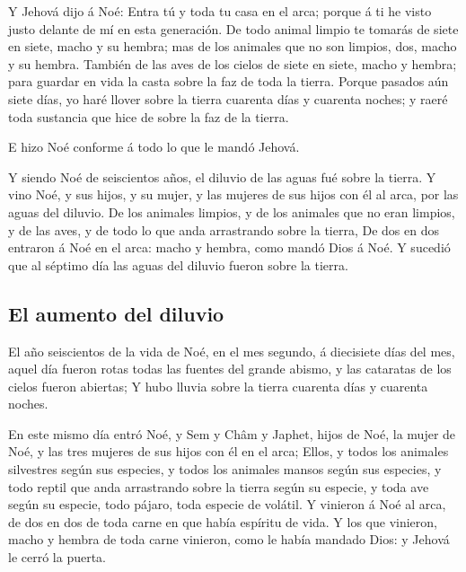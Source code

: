  Y Jehová dijo á Noé: Entra tú y toda tu casa en el arca;
porque á ti he visto justo delante de mí en esta generación.
 De todo animal limpio te tomarás de siete en siete, macho
y su hembra; mas de los animales que no son limpios, dos, macho y su
hembra.  También de las aves de los cielos de siete en
siete, macho y hembra; para guardar en vida la casta sobre la faz de
toda la tierra.  Porque pasados aún siete días, yo haré
llover sobre la tierra cuarenta días y cuarenta noches; y raeré toda
sustancia que hice de sobre la faz de la tierra.

 E hizo Noé conforme á todo lo que le mandó Jehová.

 Y siendo Noé de seiscientos años, el diluvio de las aguas
fué sobre la tierra.  Y vino Noé, y sus hijos, y su mujer,
y las mujeres de sus hijos con él al arca, por las aguas del diluvio.
 De los animales limpios, y de los animales que no eran
limpios, y de las aves, y de todo lo que anda arrastrando sobre la
tierra,  De dos en dos entraron á Noé en el arca: macho y
hembra, como mandó Dios á Noé.  Y sucedió que al séptimo
día las aguas del diluvio fueron sobre la tierra.

\hypertarget{el-aumento-del-diluvio}{%
\subsection{El aumento del diluvio}\label{el-aumento-del-diluvio}}

 El año seiscientos de la vida de Noé, en el mes segundo,
á diecisiete días del mes, aquel día fueron rotas todas las fuentes del
grande abismo, y las cataratas de los cielos fueron abiertas;
 Y hubo lluvia sobre la tierra cuarenta días y cuarenta
noches.

 En este mismo día entró Noé, y Sem y Châm y Japhet,
hijos de Noé, la mujer de Noé, y las tres mujeres de sus hijos con él en
el arca;  Ellos, y todos los animales silvestres según
sus especies, y todos los animales mansos según sus especies, y todo
reptil que anda arrastrando sobre la tierra según su especie, y toda ave
según su especie, todo pájaro, toda especie de volátil. 
Y vinieron á Noé al arca, de dos en dos de toda carne en que había
espíritu de vida.  Y los que vinieron, macho y hembra de
toda carne vinieron, como le había mandado Dios: y Jehová le cerró la
puerta.

